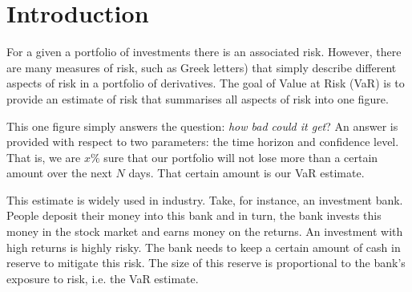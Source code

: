 \documentclass[../Dissertation.tex]{subfiles}
\begin{document}
\section{Introduction}

For a given a portfolio of investments there is an associated risk.
However, there are many measures of risk, such as Greek letters) that simply describe different aspects of risk in a portfolio of derivatives.
The goal of Value at Risk (VaR) is to provide an estimate of risk that summarises all aspects of risk into one figure.

This one figure simply answers the question: \textit{how bad could it get}?
An answer is provided with respect to two parameters: the time horizon and confidence level.
That is, we are $x\%$ sure that our portfolio will not lose more than a certain amount over the next $N$ days.
That certain amount is our VaR estimate.

This estimate is widely used in industry.
Take, for instance, an investment bank.
People deposit their money into this bank and in turn, the bank invests this money in the stock market and earns money on the returns.
An investment with high returns is highly risky.
The bank needs to keep a certain amount of cash in reserve to mitigate this risk.
The size of this reserve is proportional to the bank's exposure to risk, i.e. the VaR estimate.
\end{document}
